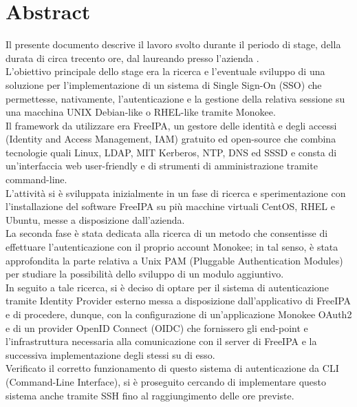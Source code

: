 
\cleardoublepage
{}
{}
\begingroup
\let\clearpage\relax
\let\cleardoublepage\relax
\let\cleardoublepage\relax

\chapter*{Abstract}

Il presente documento descrive il lavoro svolto durante il periodo di stage, della durata di circa trecento ore, dal laureando \myName \space presso l'azienda \myAzienda. \\
    L'obiettivo principale dello stage era la ricerca e l'eventuale sviluppo di una soluzione per l'implementazione di un sistema di Single Sign-On (SSO) che permettesse, nativamente, l'autenticazione e la gestione della relativa sessione su una macchina UNIX Debian-like o RHEL-like tramite Monokee. \\
    Il framework da utilizzare era FreeIPA, un gestore delle identità e degli accessi (Identity and Access Management, IAM) gratuito ed open-source che combina tecnologie quali Linux, LDAP, MIT Kerberos, NTP, DNS ed SSSD e consta di un'interfaccia web user-friendly e di strumenti di amministrazione tramite command-line. \\
    L'attività si è sviluppata inizialmente in un fase di ricerca e sperimentazione con l'installazione del software FreeIPA su più macchine virtuali CentOS, RHEL e Ubuntu, messe a disposizione dall'azienda. \\
    La seconda fase è stata dedicata alla ricerca di un metodo che consentisse di effettuare l'autenticazione con il proprio account Monokee;
in tal senso, è stata approfondita la parte relativa a Unix PAM (Pluggable Authentication Modules) per studiare la possibilità dello sviluppo di un modulo aggiuntivo. \\
    In seguito a tale ricerca, si è deciso di optare per il sistema di autenticazione tramite Identity Provider esterno messa a disposizione dall'applicativo di FreeIPA
e di procedere, dunque, con la configurazione di un'applicazione Monokee OAuth2 e di un provider OpenID Connect (OIDC) che fornissero gli end-point e l'infrastruttura 
necessaria alla comunicazione con il server di FreeIPA e la successiva implementazione degli stessi su di esso. \\
    Verificato il corretto funzionamento di questo sistema di autenticazione da CLI (Command-Line Interface), si è proseguito cercando di implementare questo sistema anche tramite SSH fino al raggiungimento delle ore previste.

%
%

\endgroup			

\vfill

